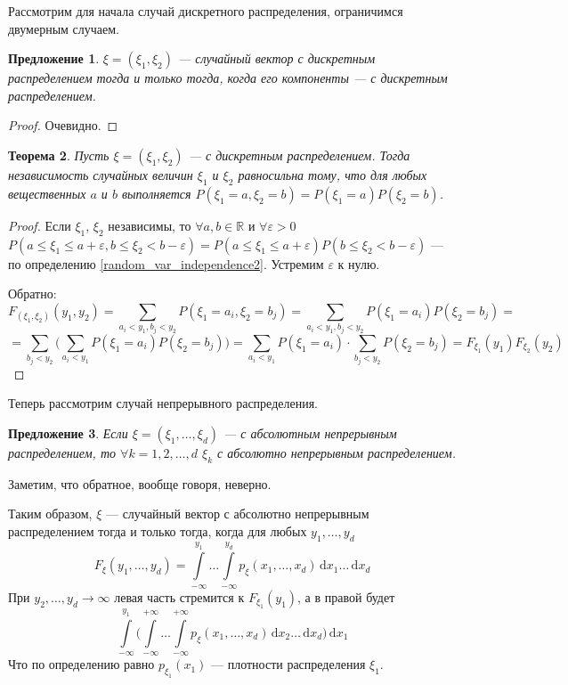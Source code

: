 \documentclass[11pt,openany,a4paper]{scrartcl}
\theoremstyle{plain}
\newtheorem{theorem}{Теорема}[subsection]
\newtheorem{proposition}[theorem]{Предложение}
\theoremstyle{definition}
\newcommand\mb{\mathbb}
\newcommand\real{\mb R}
\newcommand{\dif}{\, \mathrm d}
\begin{document}
Рассмотрим для начала случай дискретного распределения, ограничимся двумерным 
случаем.

\begin{proposition}
    $\xi = (\xi_1, \xi_2)$ — случайный вектор с дискретным распределением
    тогда и только тогда, когда его компоненты — с дискретным распределением.
\end{proposition}
\begin{proof}
    Очевидно.
\end{proof}

\begin{theorem}
    Пусть $\xi = (\xi_1, \xi_2)$ — с дискретным распределением.
    Тогда независимость
    случайных величин $\xi_1$ и $\xi_2$ равносильна тому, что для любых 
    вещественных $a$ и $b$ выполняется $P(\xi_1 = a, \xi_2 = b) =
    P(\xi_1 = a)P(\xi_2 = b)$.
\end{theorem}
\begin{proof}
        Если $\xi_1$, $\xi_2$ независимы, то
        $\forall a,b \in \real$ и $\forall \varepsilon > 0$
        $P(a \leqslant \xi_1 \leqslant a + \varepsilon,
        b \leqslant \xi_2 < b - \varepsilon) =
        P(a \leqslant \xi_1 \leqslant a + \varepsilon)
        P(b \leqslant \xi_2 < b - \varepsilon)$ — по определению 
        \ref{random_var_independence2}. Устремим $\varepsilon$ к нулю.
        
        Обратно:
        $$
        F_{(\xi_1, \xi_2)}(y_1, y_2) =
        \sum\limits_{a_i < y_1, b_j < y_2} P(\xi_1 = a_i, \xi_2 = b_j) =
        \sum\limits_{a_i < y_1, b_j < y_2} P(\xi_1 = a_i)P(\xi_2 = b_j) =
        $$
        $$
        = \sum\limits_{b_j < y_2}\Bigg(\sum\limits_{a_i < y_1}
        P(\xi_1 = a_i)P(\xi_2 = b_j)\Bigg) =
        \sum\limits_{a_i < y_1} P(\xi_1 = a_i) \cdot
        \sum\limits_{b_j < y_2} P(\xi_2 = b_j) =
        F_{\xi_1}(y_1) F_{\xi_2}(y_2)
        $$
\end{proof}

Теперь рассмотрим случай непрерывного распределения.

\begin{proposition}
    Если $\xi = (\xi_1, \ldots, \xi_d)$ — с абсолютным непрерывным распределением,
    то $\forall k = 1, 2,\ldots, d$ $\xi_k$ с абсолютно непрерывным 
    распределением.
\end{proposition}

Заметим, что обратное, вообще говоря, неверно.

Таким образом, $\xi$ — случайный вектор с абсолютно непрерывным 
распределением тогда и только тогда, когда для любых $y_1, \ldots, y_d$
$$
F_\xi(y_1, \ldots, y_d) = \int\limits_{-\infty}^{y_1}\ldots
\int\limits_{-\infty}^{y_d} p_\xi(x_1, \ldots, x_d) \dif x_1\ldots \dif x_d
$$
При $y_2, \ldots, y_d \to \infty$ левая часть стремится к $F_{\xi_1}(y_1)$,
а в правой будет
$$
\int\limits_{-\infty}^{y_1}\Bigg(\int\limits_{-\infty}^{+\infty}\ldots
\int\limits_{-\infty}^{+\infty} p_\xi(x_1, \ldots, x_d)
\dif x_2\ldots\dif x_d\Bigg)\dif x_1
$$
Что по определению равно $p_{\xi_1}(x_1)$ — плотности распределения $\xi_1$.
\end{document}
